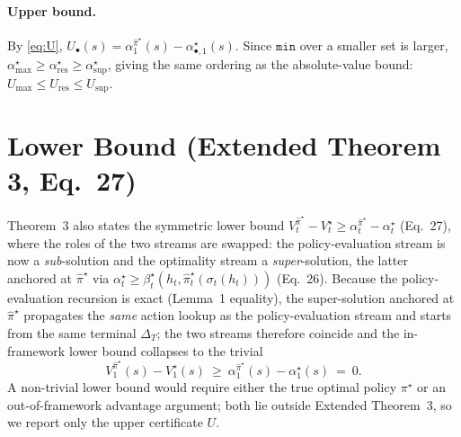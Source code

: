 \documentclass[11pt]{article}
\newcommand{\pihat}{\hat\pi}
\begin{document}
\paragraph{Upper bound.}
By \eqref{eq:U}, $U_{\bullet}(s)=\alpha^{\pihat^\star}_1(s)-\alpha^{\star}_{\bullet,1}(s)$.
Since $\texttt{min}$ over a smaller set is larger,
$\alpha^\star_{\max}\ge\alpha^\star_{\mathrm{res}}\ge\alpha^\star_{\sup}$, giving
the same ordering as the absolute-value bound:
$U_{\max}\le U_{\mathrm{res}}\le U_{\sup}$.

\section{Lower Bound (Extended Theorem 3, Eq.~27)}\label{sec:lower}
Theorem~3 also states the symmetric lower bound
$V^{\pihat^\star}_t-V^\star_t\ge\alpha^{\pihat^\star}_t-\alpha^\star_t$ (Eq.~27),
where the roles of the two streams are swapped: the policy-evaluation stream is now
a \emph{sub}-solution and the optimality stream a \emph{super}-solution, the latter
anchored at $\pihat^\star$ via $\alpha^\star_t\ge\beta^\star_t(h_t,\pihat^\star_t(\sigma_t(h_t)))$
(Eq.~26). Because the policy-evaluation recursion is exact (Lemma~1 equality), the
super-solution anchored at $\pihat^\star$ propagates the \emph{same} action lookup as
the policy-evaluation stream and starts from the same terminal $\Delta_T$; the two
streams therefore coincide and the in-framework lower bound collapses to the
trivial
\begin{equation}
V^{\pihat^\star}_1(s)-V^\star_1(s)\ \ge\ \alpha^{\pihat^\star}_1(s)-\alpha^\star_1(s)\ =\ 0 .
\label{eq:L}
\end{equation}
A non-trivial lower bound would require either the true optimal policy $\pi^\star$
or an out-of-framework advantage argument; both lie outside Extended Theorem~3, so
we report only the upper certificate $U$.
\end{document}
